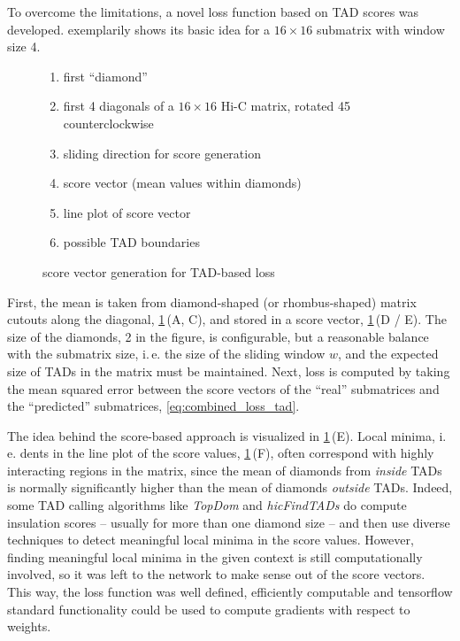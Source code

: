To overcome the limitations, a novel loss function based on TAD scores \cite{Crane2015} was developed.
 exemplarily shows its basic idea for a $16\times16$ submatrix
with window size 4.
\begin{figure}[hbt]
 \begin{minipage}{0.65\textwidth}
    \caption{score vector generation for TAD-based loss}
    \label{fig:improve:tad_score_loss_function}
 \end{minipage}\hfill
 \begin{minipage}{0.3\textwidth}
 \scriptsize
  \begin{enumerate}[label=\Alph*:,leftmargin=*]
   \raggedright
    \item first ``diamond''
    \item first 4 diagonals of a $16\times16$ Hi-C matrix, rotated \SI{45}{\deg} counterclockwise
    \item sliding direction for score generation
    \item score vector (mean values within diamonds)
    \item line plot of score vector
    \item possible TAD boundaries
\end{enumerate}
 \end{minipage}
\end{figure}
First, the mean is taken from diamond-shaped (or rhombus-shaped) matrix cutouts along the diagonal, \cref{fig:improve:tad_score_loss_function}\,(A, C),
and stored in a score vector, \cref{fig:improve:tad_score_loss_function}\,(D / E). 
The size of the diamonds, 2 in the figure, is configurable, but a reasonable balance with the submatrix size, i.\,e. the size of the sliding window $w$,
and the expected size of TADs in the matrix must be maintained.
Next, loss is computed by taking the mean squared error between the score vectors of the ``real'' submatrices and the ``predicted'' submatrices, \cref{eq:combined_loss_tad}.

The idea behind the score-based approach is visualized in \cref{fig:improve:tad_score_loss_function}\,(E).
Local minima, i.\,e. dents in the line plot of the score values, \cref{fig:improve:tad_score_loss_function}\,(F),
often correspond with highly interacting regions in the matrix, since the mean of diamonds from \emph{inside} TADs is normally significantly higher than the mean of diamonds \emph{outside} TADs.
Indeed, some TAD calling algorithms like \emph{TopDom} \cite{Shin2015} and \emph{hicFindTADs} \cite[W12f.]{Wolff2018} do compute insulation scores -- usually for more than one diamond size -- 
and then use diverse techniques to detect meaningful local minima in the score values.
However, finding meaningful local minima in the given context is still computationally involved,
so it was left to the network to make sense out of the score vectors.
This way, the loss function was well defined, efficiently computable and tensorflow standard functionality could be used to compute gradients with respect to weights.

